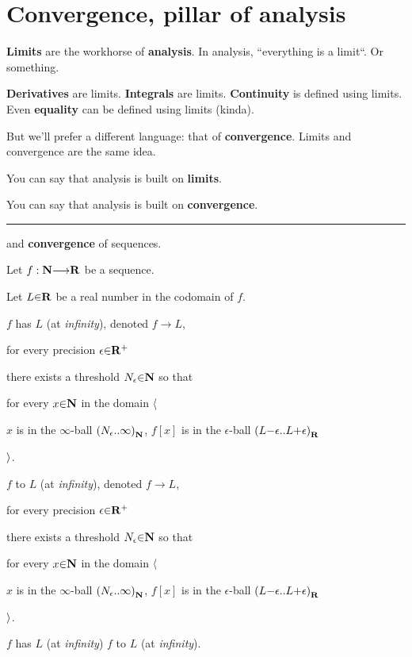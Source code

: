 \chapter{Convergence, pillar of analysis}

\vs
{\bf Limits} are the workhorse of {\bf analysis}. In analysis, ``everything is a limit``. Or something.

\vs
{\bf Derivatives} are limits. {\bf Integrals} are limits. {\bf Continuity} is defined using limits. Even {\bf equality} can be defined using limits (kinda).

\vs
But we'll prefer a different language: that of {\bf convergence}. Limits and convergence are the same idea. \par
You can say that analysis is built on {\bf limits}. \par
You can say that analysis is built on {\bf convergence}. \par

\vs\hrule\vskip1pt
 and {\bf convergence} of sequences. \par  %
Let $f: \N \to \R$ be a sequence. \par
Let $L \p\in \R$   be a real number in the codomain of $f$. \par
   $f$ has  $L$ (at {\it infinity}), denoted $f \to L$,  \par
      \hs\hs\hs for every precision $\epsilon \p\in \R^+$ \par
      \hs\hs\hs\hs there exists a threshold $N_\epsilon \p\in \N$ so that \par
      \hs\hs\hs\hs\hs for every $x \p\in \N$ in the domain $\a\langle$ \par
      \hs\hs\hs\hs\hs\hs {} $x$ is in the $\infty$-ball $\a(N_\epsilon \a{..} \infty\a)_\N$,  $f[x]$ is in the $\epsilon$-ball $\a(L\p-\epsilon \a{..} L\p+\epsilon\a)_\R$ \par
      \hs\hs\hs\hs\hs $\a\rangle$. \par
   $f$  to $L$ (at {\it infinity}), denoted $f \to L$,  \par
      \hs\hs\hs for every precision $\epsilon \p\in \R^+$ \par
      \hs\hs\hs\hs there exists a threshold $N_\epsilon \p\in \N$ so that \par
      \hs\hs\hs\hs\hs for every $x \p\in \N$ in the domain $\a\langle$ \par
      \hs\hs\hs\hs\hs\hs {} $x$ is in the $\infty$-ball $\a(N_\epsilon \a{..} \infty\a)_\N$,  $f[x]$ is in the $\epsilon$-ball $\a(L\p-\epsilon \a{..} L\p+\epsilon\a)_\R$ \par
      \hs\hs\hs\hs\hs $\a\rangle$. \par
   $f$ has  $L$ (at {\it infinity})  $f$  to $L$ (at {\it infinity}). \par

